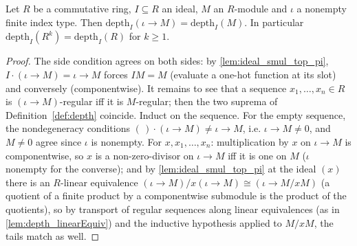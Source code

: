 \begin{lemma}
  \label{lem:depth_pi_const}
  \leanok
  Let \(R\) be a commutative ring, \(I \subseteq R\) an ideal, \(M\) an \(R\)-module and
  \(\iota\) a nonempty finite index type. Then
  \(\mathrm{depth}_I(\iota \to M) = \mathrm{depth}_I(M)\). In particular
  \(\mathrm{depth}_I(R^k) = \mathrm{depth}_I(R)\) for \(k \geq 1\).
\end{lemma}
\begin{proof}
  \leanok
  The side condition agrees on both sides: by \ref{lem:ideal_smul_top_pi},
  \(I \cdot (\iota \to M) = \iota \to M\) forces \(IM = M\) (evaluate a one-hot function
  at its slot) and conversely (componentwise). It remains to see that a sequence
  \(x_1, \dots, x_n \in R\) is \((\iota \to M)\)-regular iff it is \(M\)-regular; then
  the two suprema of Definition~\ref{def:depth} coincide. Induct on the sequence. For
  the empty sequence, the nondegeneracy conditions \((\,)\cdot(\iota \to M) \neq
  \iota \to M\), i.e. \(\iota \to M \neq 0\), and \(M \neq 0\) agree since \(\iota\) is
  nonempty. For \(x, x_1, \dots, x_n\): multiplication by \(x\) on \(\iota \to M\) is
  componentwise, so \(x\) is a non-zero-divisor on \(\iota \to M\) iff it is one on
  \(M\) (\(\iota\) nonempty for the converse); and by \ref{lem:ideal_smul_top_pi} at the
  ideal \((x)\) there is an \(R\)-linear equivalence
  \((\iota \to M)/x(\iota \to M) \cong (\iota \to M/xM)\) (a quotient of a finite
  product by a componentwise submodule is the product of the quotients), so by
  transport of regular sequences along linear equivalences (as in
  \ref{lem:depth_linearEquiv}) and the inductive hypothesis applied to \(M/xM\), the
  tails match as well.
\end{proof}

